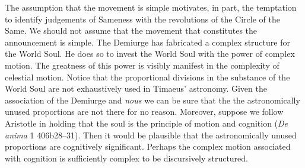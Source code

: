 The assumption that the movement is simple motivates, in part, the temptation to identify judgements of Sameness with the revolutions of the Circle of the Same. We should not assume that the movement that constitutes the announcement is simple. The Demiurge has fabricated a complex structure for the World Soul. He does so to invest the World Soul with the power of complex motion. The greatness of this power is visibly manifest in the complexity of celestial motion. Notice that the proportional divisions in the substance of the World Soul are not exhaustively used in Timaeus' astronomy. Given the association of the Demiurge and \emph{nous} we can be sure that the the astronomically unused proportions are not there for no reason. Moreover, suppose we follow Aristotle in holding that the soul is the principle of motion and cognition (\emph{De anima} 1 406b28--31). Then it would be plausible that the astronomically unused proportions are cognitively significant. Perhaps the complex motion associated with cognition is sufficiently complex to be discursively structured.


 



